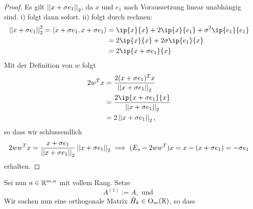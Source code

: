 \begin{proof}
  Es gilt $\left|\left|x+\sigma e_1\right|\right|_2$, da $x$ und $e_1$ nach Voraussetzung linear unabhängig sind. i) folgt dann sofort. ii) folgt durch rechnen:
  \begin{align*}
    \eukno{x+\sigma e_1}^2 = \langle x+\sigma e_1,x+\sigma e_1\rangle &= \ip{x}{x}+2\ip{x}{e_1}+\sigma^2 \ip{e_1}{e_1}\\
    &= 2\ip{x}{x}+2\sigma \ip{e_1}{x}\\
    &= 2\ip{x+\sigma e_1}{x}
  \end{align*}
  Mit der Definition von $w$ folgt
  \begin{align*}
    2w^Tx&= \frac{2(x+\sigma e_1)^Tx}{\eukno{x+\sigma e_1}} \\
    &= \frac{2\ip{x+\sigma e_1}{x}}{\eukno{x+\sigma e_1}}\\
    &= 2\eukno{x+\sigma e_1},
  \end{align*}
  so dass wir schlussendlich
  \[
    2ww^Tx = \frac{x+\sigma e_1}{\left|\left|x+\sigma e_1\right|\right|_2}\left|\left|x+\sigma e_1\right|\right|_2\implies (E_s-2ww^T)x = x-\left(x+\sigma e_1\right) = -\sigma e_1
  \]
  erhalten.
\end{proof}
Sei nun $a\in \mathbb{R}^{m,n}$ mit vollem Rang. Setze
\[
A^{(1)}:= A,\text{ und }\]
Wir suchen nun eine orthogonale Matrix $\hat{H}_k\in \operatorname{O}_{m}(\mathbb{R})$, so dass

